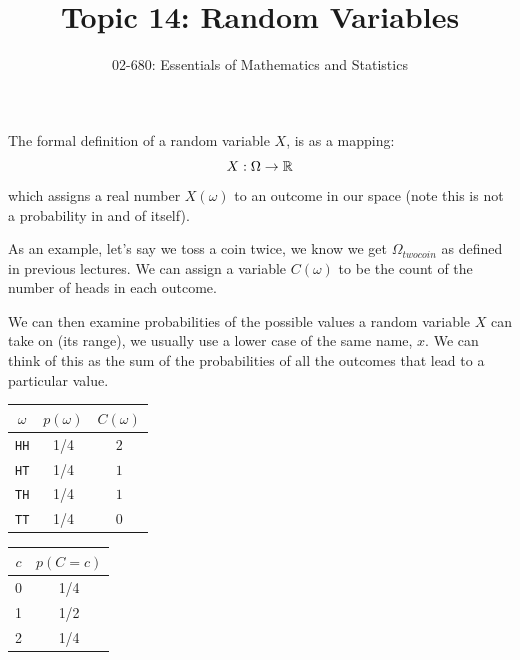 

\title{Topic 14: Random Variables}
\author{02-680: Essentials of Mathematics and Statistics}


\maketitle

The formal definition of a random variable $X$, is as a mapping: \[X: \Omega \to \operatorname{\mathbb{R}}\]
which assigns a real number $X(\omega)$ to an outcome in our space (note this is not a probability in and of itself). 

As an example, let's say we toss a coin twice, we know we get $\Omega_{twocoin}$ as defined in previous lectures. 
We can assign a variable $C(\omega)$ to be the count of the number of heads in each outcome.


We can then examine probabilities of the possible values a random variable $X$ can take on (its range), 
we usually use a lower case of the same name, $x$. 
We can think of this as the sum of the probabilities 
of all the outcomes that lead to a particular value. 

\begin{center}
\begin{tabular}{c|c|c}
\textbf{$\omega$} & \textbf{$p(\omega)$} & \textbf{$C(\omega)$}\\
\hline
\texttt{HH}		& 1/4 &		$2$\\
\texttt{HT}		& 1/4 &		$1$\\
\texttt{TH}		& 1/4 &		$1$\\
\texttt{TT}		& 1/4 &		$0$\\
\end{tabular}%
%
\hspace{5em}%
%
\begin{tabular}{c|c}
\textbf{$c$} &	\textbf{$p(C=c)$}\\
\hline
0 &		1/4\\
1 &		1/2\\
2 & 		1/4\\
\end{tabular}
\end{center}

